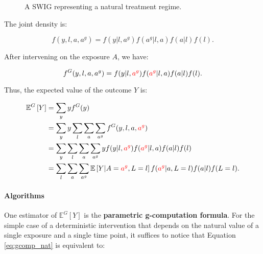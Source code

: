 \documentclass[12pt,twoside]{article}
\begin{document}
\begin{figure}[ht]
\centering
{}
\caption{A SWIG representing a natural treatment regime.}
\label{fig:swig_det_nat_inv}
\end{figure}

The joint density is:

\begin{equation}
    f(y,l,a,a^g) = f(y|l,a^g) f(a^g|l,a) f(a|l) f(l).
\end{equation}

After intervening on the exposure $A$, we have:

\begin{equation}
    f^G(y,l,a,a^g) = f(y|l,\textcolor{red}{a^g}) f(\textcolor{red}{a^g}|l,a) f(a|l) f(l).
\end{equation}

Thus, the expected value of the outcome $Y$ is:

\begin{align}
    \mathbb{E}^G \left[ Y \right] &= \sum_y y f^G(y) \\
    &= \sum_y y \sum_l \sum_a \sum_{a^g} f^G(y,l,a,\textcolor{red}{a^g}) \\
    &= \sum_y \sum_l \sum_a \sum_{a^g} y f(y|l,\textcolor{red}{a^g}) f(\textcolor{red}{a^g}|l,a) f(a|l) f(l) \\
    &= \sum_l \sum_a \sum_{a^g} \mathbb{E} \left[ Y|A=\textcolor{red}{a^g},L=l\right] f(\textcolor{red}{a^g}|a,L=l) f(a|l) f(L=l). \label{eq:gcomp_nat}
\end{align}

\paragraph*{Algorithms}
One estimator of $\mathbb{E}^G [Y]$ is the \textbf{parametric g-computation formula}. For the simple case of a deterministic intervention that depends on the natural value of a single exposure and a single time point, it suffices to notice that Equation \ref{eq:gcomp_nat} is equivalent to:
\end{document}
